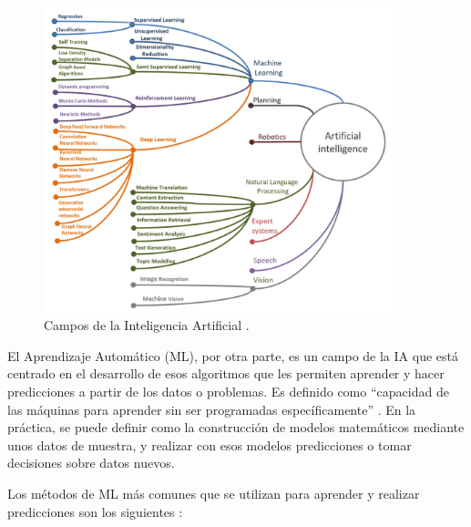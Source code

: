 \documentclass[12pt]{report} %
\begin{document}
\begin{figure}[h]
	\centering
	\includegraphics[width=0.9\textwidth]{sectionsAI.png}
	\caption{Campos de la Inteligencia Artificial \cite{artInt}.}
	\label{fig:imagen23}
\end{figure}

El Aprendizaje Automático (ML), por otra parte, es un campo de la IA que está centrado en el desarrollo de esos algoritmos que les permiten aprender y hacer predicciones a partir de los datos o problemas. Es definido como “capacidad de las máquinas para aprender sin ser programadas específicamente” \cite{deepLearning}. En la práctica, se puede definir como la construcción de modelos matemáticos mediante unos datos de muestra, y realizar con esos modelos predicciones o tomar decisiones sobre datos nuevos. 
\cite{deepLearning}

Los métodos de ML más comunes que se utilizan para aprender y realizar predicciones son los siguientes 
\cite{deepLearning} \cite{artInt}:
\end{document}

